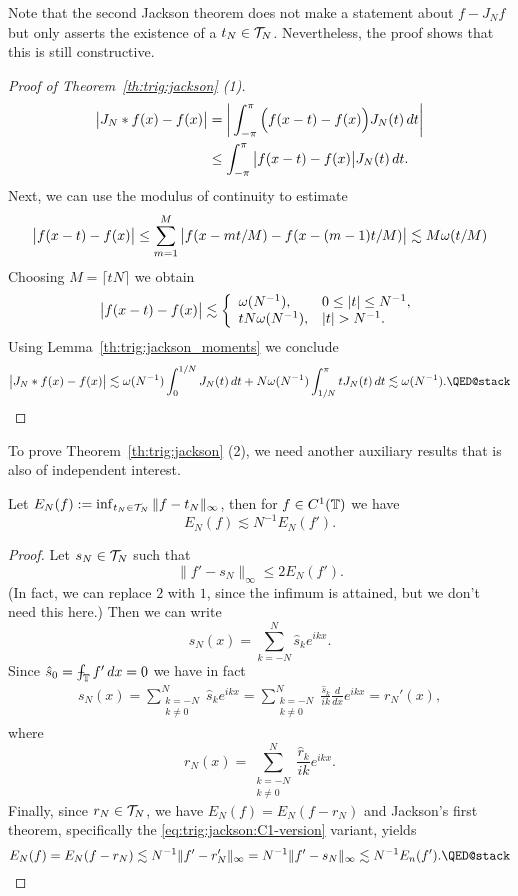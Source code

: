 Note that the second Jackson theorem does not make a statement about $f - J_N f$
but only asserts the existence of a $t_N \in \mathcal{T}_N$. Nevertheless, the proof
shows that this is still constructive.

\begin{proof}[Proof of Theorem~\ref{th:trig:jackson} (1)]
  \begin{align*}
    \big| J_N \ast f(x) - f(x) \big|
    &=
    \bigg| \int_{-\pi}^\pi \Big( f(x-t) - f(x) \Big) J_N(t) \, dt \bigg| \\
    &\leq
    \int_{-\pi}^\pi \big|f(x-t) - f(x) \big| J_N(t) \, dt.
  \end{align*}
  Next, we can use the modulus of continuity to estimate
  \[
    \big|f(x-t) - f(x) \big| \leq \sum_{m = 1}^M
      \big| f(x - mt/M) - f(x - (m-1)t/M) \big|
    \lesssim M \omega(t/M)
  \]
  Choosing $M = \lceil tN \rceil$ we obtain
  \[
    \big|f(x-t) - f(x) \big| \lesssim
      \left\{ \begin{array}{ll} 
        \omega(N^{-1}), & 0 \leq |t| \leq N^{-1}, \\
        t N \omega(N^{-1}), & |t| > N^{-1}.
       \end{array} \right.
  \]
  Using Lemma~\ref{th:trig:jackson_moments} we conclude
  \[
    \b| J_N \ast f(x) - f(x) \b|
    \lesssim
      \omega(N^{-1}) \int_0^{1/N} J_N(t) \, dt
      + N \omega(N^{-1}) \int_{1/N}^{\pi} t J_N(t)\, dt
    \lesssim \omega(N^{-1}). \qedhere
  \]
\end{proof}

To prove Theorem~\ref{th:trig:jackson} (2), we need another auxiliary
results that is also of independent interest.

\begin{lemma} \label{th:trig:jackson-auxEN}
  Let $E_N(f) := \inf_{t_N \in \mathcal{T}_N} \|f - t_N \|_\infty$, then for
  $f \in C^1(\mathbb{T})$ we have
  \[
    E_N(f) \lesssim N^{-1} E_N(f').
  \]
\end{lemma}
\begin{proof}
  Let $s_N \in \mathcal{T}_N$ such that
  \[
    \|f' - s_N\|_\infty \leq 2 E_N(f').
  \]
  (In fact, we can replace $2$ with $1$, since the infimum is attained, but
    we don't need this here.) Then we can write
  \[
    s_N(x) = \sum_{k = -N}^N \hat{s}_{k} e^{ikx}.
  \]
  Since $\hat{s}_{0} = \mint_\TT f' \,dx = 0$ we have in fact
  \begin{align*}
    s_N(x)
    =
    \sum_{\substack{k = -N \\ k \neq 0}}^N \hat{s}_{k} e^{ikx}
    =
    \sum_{\substack{k = -N \\ k \neq 0}}^N \frac{\hat{s}_{k}}{ik} \frac{d}{dx} e^{ikx}
    =
    r_N'(x),
  \end{align*}
  where
  \[
    r_N(x) =
    \sum_{\substack{k = -N \\ k \neq 0}}^N \frac{\hat{r}_{k}}{ik} e^{ikx}.
  \]
  Finally, since $r_N \in \mathcal{T}_N$, we have $E_N(f) = E_N(f - r_N)$ and
  Jackson's first theorem, specifically the \eqref{eq:trig:jackson:C1-version}
  variant, yields
  \[
    E_N(f)
    = E_N(f - r_N) \lesssim N^{-1} \| f' - r_N' \|_\infty
    = N^{-1} \| f' - s_N \|_\infty
    \lesssim N^{-1} E_n(f'). \qedhere
  \]
\end{proof}


